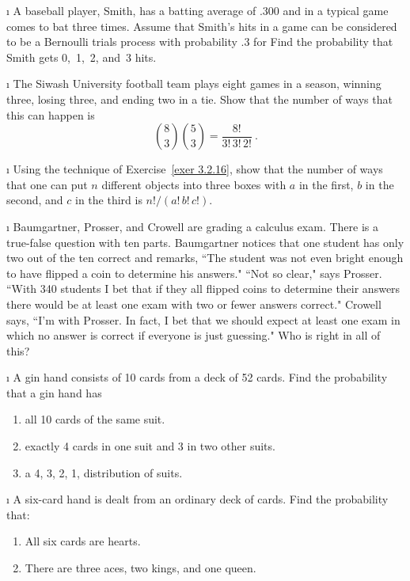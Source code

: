 \begin{LJSItem}
\i\label{exer 3.2.15} A baseball player, Smith, has a batting average of $.300$ and in
a typical game comes to bat three times.  Assume that Smith's hits in a game can be
considered to be a Bernoulli trials process with probability .3 for  
Find the probability that Smith gets 0,~1,~2, and~3 hits.

\i\label{exer 3.2.16} The Siwash University football team plays eight
games in a season, winning three, losing three, and ending two in a tie.   Show that
the number of ways that this can happen is
$$ {8 \choose 3}{5 \choose 3} = \frac {8!}{3!\,3!\,2!}\ .
$$

\i\label{exer 3.2.17} Using the technique of Exercise~\ref{exer 3.2.16},  show that
the number of ways that one can put $n$ different objects into three boxes  with $a$
in the first, $b$ in the second, and $c$ in the third is $n!/(a!\,b!\,c!)$.

\i\label{exer 3.2.18} Baumgartner, Prosser, and Crowell are grading a calculus
exam.  There is a true-false question with ten parts.  Baumgartner notices that one
student has only two out of the ten correct and remarks, ``The student was not even
bright enough to have flipped a coin to determine his answers."  ``Not so clear,"
says Prosser.  ``With 340 students I bet that if they all flipped coins to determine
their answers there would be at least one exam with two or fewer answers correct." 
Crowell says, ``I'm with Prosser.  In fact, I bet that we should expect at least one
exam in which no answer is correct if everyone is just guessing."  Who is right in
all of this?

\i\label{exer 3.2.19} A gin hand consists of 10 cards from a deck of 52 cards. 
Find the probability that a gin hand has

\begin{enumerate}
\item all 10 cards of the same suit.

\item exactly 4 cards in one suit and 3 in two other suits.

\item a 4, 3, 2, 1, distribution of suits.
\end{enumerate}

\i\label{exer 3.2.20} A six-card hand is dealt from an ordinary deck of cards. 
Find the probability that:
\begin{enumerate}
\item All six cards are hearts.

\item There are three aces, two kings, and one queen.


\end{enumerate}
\end{LJSItem}
